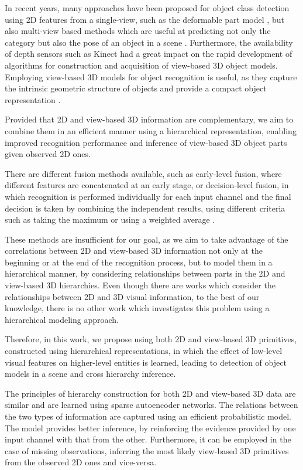 \documentclass[runningheads]{llncs}
\begin{document}
In recent years, many approaches have been proposed for object class detection using 2D features from a single-view, such as the deformable part model \cite{Felzenswalb2010}, but also multi-view based methods which are useful at predicting not only the category but also the pose of an object in a scene \cite{Teney2014}. Furthermore, the availability of depth sensors such as Kinect had a great impact on the rapid development of algorithms for construction and acquisition of view-based 3D object models. Employing view-based 3D models for object recognition is useful, as they capture the intrinsic geometric structure of objects and provide a compact object representation \cite{Liebelt2010}. 

Provided that 2D and view-based 3D information are complementary, we aim to combine them in an efficient manner using a hierarchical representation, enabling improved recognition performance and inference of view-based 3D object parts given observed 2D ones. 

There are different fusion methods available, such as early-level fusion, where different features are concatenated at an early stage, or decision-level fusion, in which recognition is performed individually for each input channel and the final decision is taken by combining the independent results, using different criteria such as taking the maximum or using a weighted average \cite{Mahmoudi2013}.

These methods are insufficient for our goal, as we aim to take advantage of the correlations between 2D and view-based 3D information not only at the beginning or at the end of the recognition process, but to model them in a hierarchical manner, by considering relationships between parts in the 2D and view-based 3D hierarchies. Even though there are works which consider the relationships between 2D and 3D visual information, to the best of our knowledge, there is no other work which investigates this problem using a hierarchical modeling approach.

Therefore, in this work, we propose using both 2D and view-based 3D primitives, constructed using hierarchical representations, in which the effect of low-level visual features on higher-level entities is learned, leading to detection of object models in a scene and cross hierarchy inference. 

The principles of hierarchy construction for both 2D and view-based 3D data are similar and are learned using sparse autoencoder networks. The relations between the two types of information are captured using an efficient probabilistic model. The model provides better inference, by reinforcing the evidence provided by one input channel with that from the other. Furthermore, it can be employed in the case of missing observations, inferring the most likely view-based 3D primitives from the observed 2D ones and vice-versa. 
\end{document}
